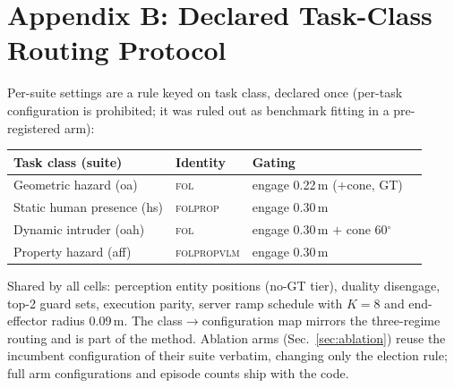 \documentclass[conference]{IEEEtran}
\begin{document}
\section*{Appendix B: Declared Task-Class Routing Protocol}
Per-suite settings are a rule keyed on task class, declared once (per-task configuration is prohibited; it was ruled out as benchmark fitting in a pre-registered arm):
\begin{center}
\small
\begin{tabular}{llll}
\toprule
Task class (suite) & Identity & Gating \\
\midrule
Geometric hazard (oa) & \textsc{fol} & engage 0.22\,m ($+$cone, GT) \\
Static human presence (hs) & \textsc{folprop} & engage 0.30\,m \\
Dynamic intruder (oah) & \textsc{fol} & engage 0.30\,m $+$ cone 60$^\circ$ \\
Property hazard (aff) & \textsc{folpropvlm} & engage 0.30\,m \\
\bottomrule
\end{tabular}
\end{center}
Shared by all cells: perception entity positions (no-GT tier), duality disengage, top-2 guard sets, execution parity, server ramp schedule with $K{=}8$ and end-effector radius 0.09\,m. The class$\to$configuration map mirrors the three-regime routing and is part of the method. Ablation arms (Sec.~\ref{sec:ablation}) reuse the incumbent configuration of their suite verbatim, changing only the election rule; full arm configurations and episode counts ship with the code.
\end{document}
